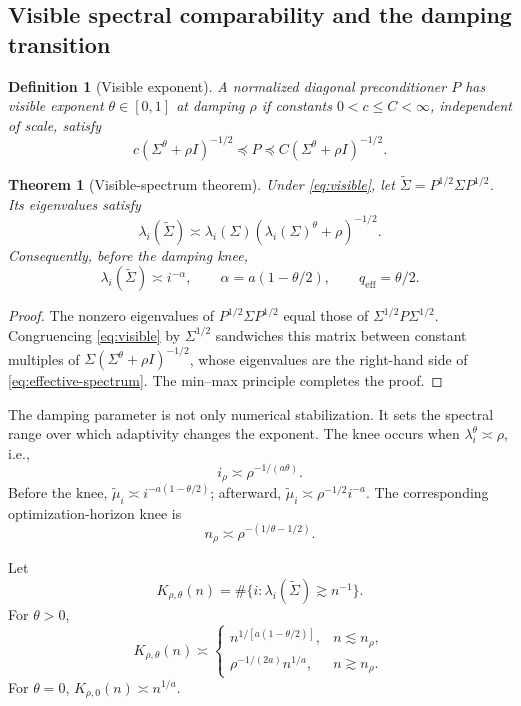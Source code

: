 \documentclass[letterpaper]{article} %
\newtheorem{theorem}{Theorem}
\newtheorem{definition}{Definition}
\newcommand{\pre}{\preceq}
\newcommand{\tSig}{\widetilde\Sigma}
\newcommand{\tmu}{\widetilde\mu}
\newcommand{\qeff}{q_{\mathrm{eff}}}
\newcommand{\Kvis}{K_{\rho,\theta}}
\begin{document}
\subsection{Visible spectral comparability and the damping transition}

\begin{definition}[Visible exponent]
\label{def:visible}
A normalized diagonal preconditioner $P$ has visible exponent $\theta\in[0,1]$ at damping $\rho$ if constants $0<c\le C<\infty$, independent of scale, satisfy
\begin{equation}
\label{eq:visible}
 c(\Sigma^\theta+\rho I)^{-1/2}
 \pre P\pre
 C(\Sigma^\theta+\rho I)^{-1/2}.
\end{equation}
\end{definition}

\begin{theorem}[Visible-spectrum theorem]
\label{thm:visible}
Under \eqref{eq:visible}, let $\tSig=P^{1/2}\Sigma P^{1/2}$.  Its eigenvalues satisfy
\begin{equation}
\label{eq:effective-spectrum}
 \lambda_i(\tSig)\asymp
 \lambda_i(\Sigma)(\lambda_i(\Sigma)^\theta+\rho)^{-1/2}.
\end{equation}
Consequently, before the damping knee,
\[
 \lambda_i(\tSig)\asymp i^{-\alpha},
 \qquad \alpha=a(1-\theta/2),
 \qquad \qeff=\theta/2.
\]
\end{theorem}

\begin{proof}
The nonzero eigenvalues of $P^{1/2}\Sigma P^{1/2}$ equal those of $\Sigma^{1/2}P\Sigma^{1/2}$.  Congruencing \eqref{eq:visible} by $\Sigma^{1/2}$ sandwiches this matrix between constant multiples of $\Sigma(\Sigma^\theta+\rho I)^{-1/2}$, whose eigenvalues are the right-hand side of \eqref{eq:effective-spectrum}.  The min--max principle completes the proof.
\end{proof}

The damping parameter is not only numerical stabilization.  It sets the spectral range over which adaptivity changes the exponent.  The knee occurs when $\lambda_i^\theta\asymp\rho$, i.e.,
\[
 i_\rho\asymp\rho^{-1/(a\theta)}.
\]
Before the knee, $\tmu_i\asymp i^{-a(1-\theta/2)}$; afterward, $\tmu_i\asymp\rho^{-1/2}i^{-a}$.  The corresponding optimization-horizon knee is
\[
 n_\rho\asymp\rho^{-(1/\theta-1/2)}.
\]

Let
\[
 \Kvis(n)=\#\{i:\lambda_i(\tSig)\gtrsim n^{-1}\}.
\]
For $\theta>0$,
\begin{equation}
\label{eq:learned-count}
 \Kvis(n)\asymp
 \begin{cases}
 n^{1/[a(1-\theta/2)]},
 & n\lesssim n_\rho,\\
 \rho^{-1/(2a)}n^{1/a},
 & n\gtrsim n_\rho.
 \end{cases}
\end{equation}
For $\theta=0$, $K_{\rho,0}(n)\asymp n^{1/a}$.
\end{document}
